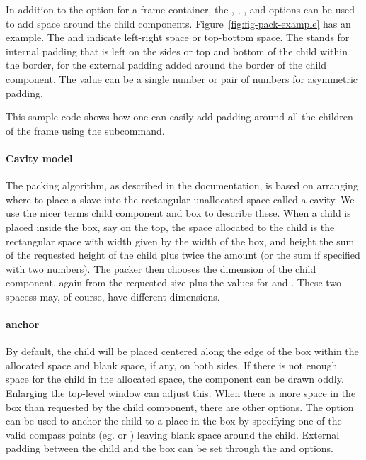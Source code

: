 In addition to the  option for a frame container, the
, , ,
and  options can be used to add space around the
child components. Figure~\ref{fig:fig-pack-example} has an
example. The  and  indicate left-right space or
top-bottom space. The  stands for internal padding that is
left on the sides or top and bottom of the child within the border,
for  the external padding added around the border of the
child component. The value can be a single number or pair of numbers
for asymmetric padding.


This sample code shows how one can easily add padding around all the
children of the frame  using the
 subcommand.



\paragraph{Cavity model}
The packing algorithm, as described in the \Tk\/ documentation, is based
on arranging where to place a slave into the rectangular unallocated
space called a cavity. We use the nicer terms child component and box
to describe these. When a child is placed inside the box, say on the
top, the space allocated to the child is the rectangular space with
width given by the width of the box, and height the sum of the
requested height of the child plus twice the  amount (or
the sum if specified with two numbers). The packer then chooses the
dimension of the child component, again from the requested size plus
the  values for  and . These two spacess
may, of course, have different dimensions.


\paragraph{anchor}
By default, the child  will be placed centered along the edge of
the box within the allocated space and blank space, if any, on both
sides.  If there is not enough space for the child in the allocated
space, the component can be drawn oddly. Enlarging the top-level
window can adjust this. When there is more space in the box than
requested by the child component, there are other options. The
 option can be used to anchor the child to a
place in the box by specifying one of the valid compass points
(eg.  or ) leaving blank space around the
child. External padding between the child and the box can be set through the
 and  options.

